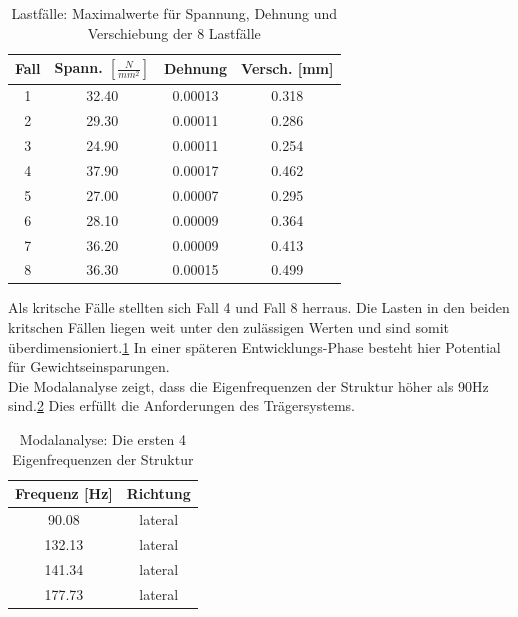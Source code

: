 \documentclass[twoside]{article}
\begin{document}
\begin{multicols}{2}
\begin{table}[H]
            \begin{tabular}{cccc}
               \toprule  
               Fall & Spann. $[\frac{N}{mm^2}]$ & Dehnung & Versch. [mm]\\
               \midrule
               1 & 32.40 & 0.00013 & 0.318\\
               2 & 29.30 & 0.00011 & 0.286\\
               3 & 24.90 & 0.00011 & 0.254\\
               4 & 37.90 & 0.00017 & 0.462\\
               5 & 27.00 & 0.00007 & 0.295\\
               6 & 28.10 & 0.00009 & 0.364\\
               7 & 36.20 & 0.00009 & 0.413\\
               8 & 36.30 & 0.00015 & 0.499\\
               \bottomrule
            \end{tabular}
            \caption{Lastfälle: Maximalwerte für Spannung, Dehnung und Verschiebung der 8 Lastfälle}
            \label{tab:load_case}
         \end{table}  		
         Als kritsche Fälle stellten sich Fall 4 und Fall 8 herraus. Die Lasten in den beiden kritschen Fällen liegen weit unter den zulässigen Werten und sind somit überdimensioniert.\ref{tab:load_case} In einer späteren Entwicklungs-Phase besteht hier Potential für Gewichtseinsparungen.\\	
         Die Modalanalyse zeigt, dass die Eigenfrequenzen der  Struktur höher als 90Hz sind.\ref{tab:modal} Dies erfüllt die Anforderungen des Trägersystems.      
         \begin{table}[H]
            \centering
            \begin{tabular}{cc}
               \toprule  
               Frequenz [Hz] & Richtung \\
               \midrule
               90.08 & lateral   \\
               132.13 & lateral  \\
               141.34 & lateral\\
               177.73 & lateral\\
               \bottomrule
            \end{tabular}
            \caption{Modalanalyse: Die ersten 4 Eigenfrequenzen der Struktur}
            \label{tab:modal}
         \end{table}

\end{multicols}
\end{document}
